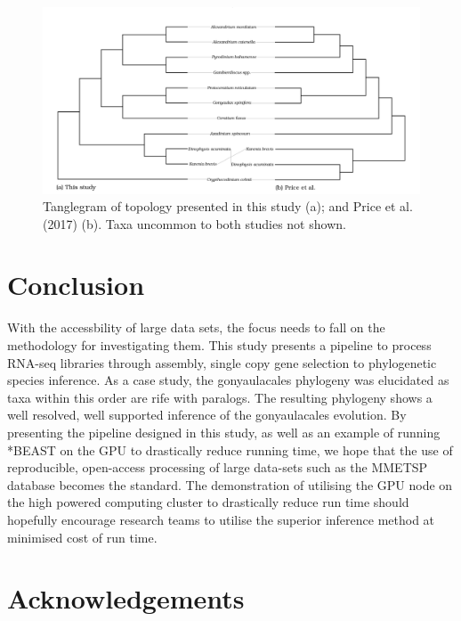 \documentclass[12pt]{article}
\begin{document}
\FloatBarrier 
\begin{figure} 
\includegraphics[scale=.23]{Price-comparison.png} 
\caption{Tanglegram of topology presented in this study (a); and Price et al. (2017) (b). Taxa uncommon to both studies not shown.} 
\label{fig:tangle}
\end{figure} 
\FloatBarrier

\newpage
\section{Conclusion}
With the accessbility of large data sets, the focus needs to fall on the methodology for investigating them. This study presents a pipeline to process RNA-seq libraries through assembly, single copy gene selection to phylogenetic species inference. As a case study, the gonyaulacales phylogeny was elucidated as taxa within this order are rife with paralogs. The resulting phylogeny shows a well resolved, well supported inference of the gonyaulacales evolution. By presenting the pipeline designed in this study, as well as an example of running *BEAST on the GPU to drastically reduce running time, we hope that the use of reproducible, open-access processing of large data-sets such as the MMETSP database becomes the standard. The demonstration of utilising the GPU node on the high powered computing cluster to drastically reduce run time should hopefully encourage research teams to utilise the superior inference method at minimised cost of run time. 
\newpage

\section{Acknowledgements}


\end{document}
